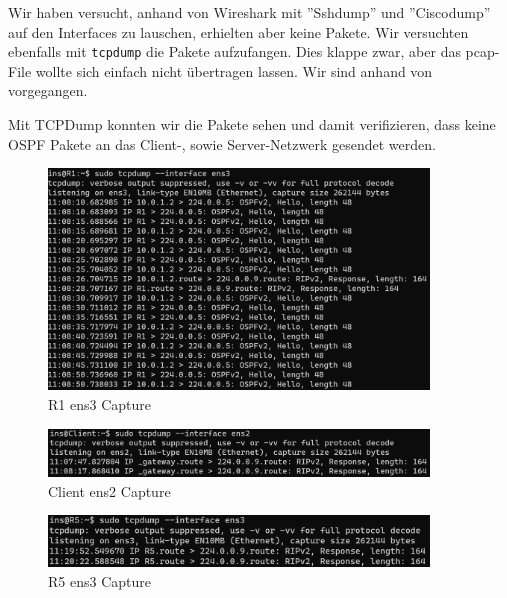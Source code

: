 \documentclass[11pt,titlepage]{article}
\begin{document}
Wir haben versucht, anhand von Wireshark mit ''Sshdump'' und ''Ciscodump'' auf den Interfaces zu lauschen, erhielten aber keine Pakete.
Wir versuchten ebenfalls mit \lstinline!tcpdump! die Pakete aufzufangen. Dies klappe zwar, aber das pcap-File wollte sich einfach nicht übertragen lassen. Wir sind anhand von \cite{TCPDUMP} vorgegangen.

\medskip

Mit TCPDump konnten wir die Pakete sehen und damit verifizieren, dass keine OSPF Pakete an das Client-, sowie Server-Netzwerk gesendet werden.

\begin{figure}[H]
	\begin{center}
		\includegraphics[width=0.90\textwidth]{"images/R1 OSPF Capture"}
		\caption{R1 ens3 Capture}
		\label{fig:R1-OSPF-Capture}
	\end{center}
\end{figure}

\begin{figure}[H]
	\begin{center}
		\includegraphics[width=0.90\textwidth]{"images/Client OSPF Capture"}
		\caption{Client ens2 Capture}
		\label{fig:client-OSPF-Capture}
	\end{center}
\end{figure}

\begin{figure}[H]
	\begin{center}
		\includegraphics[width=0.90\textwidth]{"images/R5 OSPF Capture"}
		\caption{R5 ens3 Capture}
		\label{fig:client-OSPF-Capture}
	\end{center}
\end{figure}
\end{document}
